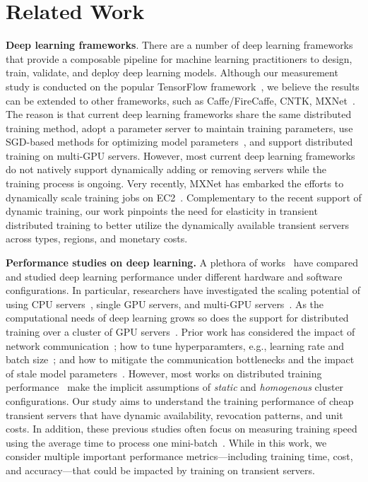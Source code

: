 \section{Related Work}


\textbf{Deep learning frameworks}. There are a number of deep learning
frameworks~\cite{caffe2,tensorflow,pytorch,tensor2tensor} that provide a
composable pipeline for machine learning practitioners to design, train,
validate, and deploy deep learning models. Although our measurement study is
conducted on the popular TensorFlow framework~\cite{tensorflow}, we believe the
results can be extended to other frameworks, such as Caffe/FireCaffe, CNTK,
MXNet~\cite{caffe2,cntk,mxnet}. The reason is that current deep learning
frameworks share the same distributed training method, adopt a parameter server
to maintain training parameters, use SGD-based methods for optimizing model
parameters~\cite{sgd1,stale4}, and support distributed training on multi-GPU
servers. However, most current deep learning frameworks do not natively
support dynamically adding or removing servers while the training process is
ongoing. Very recently, MXNet has embarked the efforts to dynamically scale
training jobs on EC2~\cite{dt_mxnet}. Complementary to the recent support of
dynamic training, our work pinpoints the need for elasticity in transient
distributed training to better utilize the dynamically available transient
servers across types, regions, and monetary costs. 


\textbf{Performance studies on deep learning.} A plethora of
works~\cite{2016cloudandbigdata} have compared and studied deep learning
performance under different hardware and software configurations.  In
particular, researchers have investigated the scaling potential of using CPU
servers~\cite{jeffdean}, single GPU servers, and multi-GPU
servers~\cite{shi2018performance}.  As the computational needs of deep learning
grows so does the support for distributed training over a cluster of GPU
servers~\cite{project_adam,firecaffe,geeps}. Prior work has considered the
impact of network communication~\cite{lin2017deep, wen2017terngrad,
strom2015scalable}; how to tune hyperparamters, e.g., learning rate and batch
size~\cite{srinivasan2018analysis,stale4,goyal2017accurate,you2018imagenet,akiba2017extremely};
and how to mitigate the communication bottlenecks and the impact of stale model
parameters~\cite{stale1,stale2,stale3,stale4}.  However, most works on
distributed training performance~\cite{shi2018performance,dl_perf1,dl_perf2}
make the implicit assumptions of \emph{static} and \emph{homogenous} cluster
configurations. Our study aims to understand the training performance of cheap
transient servers that have dynamic availability, revocation patterns, and unit
costs. In addition, these previous studies often focus on measuring training
speed using the average time to process one
mini-batch~\cite{2016cloudandbigdata,shi2018performance,peng2018optimus}. While
in this work, we consider multiple important performance metrics---including
training time, cost, and accuracy---that could be impacted by training on
transient servers. 

